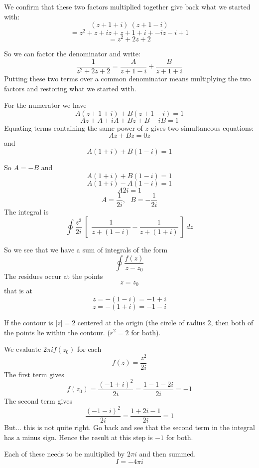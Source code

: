 \documentclass[11pt, oneside]{article}
\begin{document}
We confirm that these two factors multiplied together give back what we started with:
\[ (z + 1 + i) \ (z + 1 - i) \]
\[ = z^2 + z + iz + z + 1 + i + -iz - i + 1 \] 
\[ = z^2 + 2z + 2 \]

So we can factor the denominator and write:
\[ \frac{1}{z^2 + 2z + 2} = \frac{A}{z + 1 - i} + \frac{B}{z + 1 + i}  \]
Putting these two terms over a common denominator means multiplying the two factors and restoring what we started with.

For the numerator we have
\[ A(z + 1 + i) + B(z + 1 - i) = 1 \]
\[ Az + A + iA + Bz + B - iB = 1 \]
Equating terms containing the same power of $z$ gives two simultaneous equations:
\[ Az + Bz = 0z \]
and
\[ A(1 + i) + B(1 - i) = 1 \]

So $A = -B$ and
\[ A(1 + i) + B(1 - i) = 1 \]
\[ A (1 + i) - A(1 - i) = 1 \]
\[ A 2i = 1 \]
\[ A = \frac{1}{2i}, \ \ \ B = -\frac{1}{2i} \]
The integral is
\[ \oint \frac{z^2}{2i} \ [ \ \ \frac{1}{z + (1 - i)} -  \frac{1}{z + (1 + i)} \ ] \ dz \]

So we see that we have a sum of integrals of the form
\[ \oint \frac{f(z)}{z - z_0} \]
The residues occur at the points
\[ z = z_0 \]
that is at 
\[ z = - (1 - i) = -1 + i \]
\[ z = - (1 + i) = -1 - i \]

If the contour is $|z| = 2$ centered at the origin (the circle of radius $2$, then both of the points lie within the contour.  ($ r^2 = 2$ for both).

We evaluate $2 \pi i f(z_0)$ for each
\[ f(z) = \frac{z^2}{2i} \]
The first term gives
\[ f(z_0) = \frac{(-1 + i)^2}{2i} =  \frac{1 - 1 - 2i}{2i} = -1 \]
The second term gives 
\[ \frac{(-1 -i)^2}{2i} = \frac{1 + 2i - 1}{2i} = 1 \]
But...  this is not quite right.  Go back and see that the second term in the integral has a minus sign.  Hence the result at this step is $-1$ for both.

Each of these needs to be multiplied by $2 \pi i$ and then summed.
\[ I = -4 \pi i \]
\end{document}
